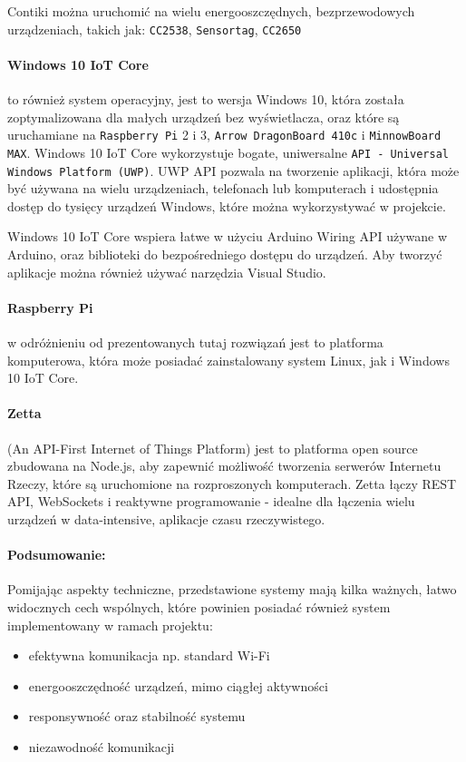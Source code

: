 Contiki można uruchomić na wielu energooszczędnych, bezprzewodowych urządzeniach, takich jak\cite{contiki-hardware-www}: \texttt{CC2538}, \texttt{Sensortag}, \texttt{CC2650}

\paragraph{Windows 10 IoT Core}\cite{windows-iot-www} to również system operacyjny, jest to wersja Windows 10, która została zoptymalizowana dla małych urządzeń bez wyświetlacza, oraz które są uruchamiane na \texttt{Raspberry Pi} 2 i 3, \texttt{Arrow DragonBoard 410c} i \texttt{MinnowBoard MAX}. 
Windows 10 IoT Core wykorzystuje bogate, uniwersalne \texttt{API - Universal Windows Platform (UWP)}. UWP API pozwala na tworzenie aplikacji, która może być używana na wielu urządzeniach, telefonach lub komputerach i udostępnia dostęp do tysięcy urządzeń Windows, które można wykorzystywać w projekcie.

Windows 10 IoT Core wspiera łatwe w użyciu Arduino Wiring API używane w Arduino, oraz biblioteki do bezpośredniego dostępu do urządzeń. Aby tworzyć aplikacje można również używać narzędzia Visual Studio.


\paragraph{Raspberry Pi}\cite{raspberry-www} w odróżnieniu od prezentowanych tutaj rozwiązań jest to platforma komputerowa, która może posiadać zainstalowany system Linux, jak i Windows 10 IoT Core.

\paragraph{Zetta}\cite{zetta-www} (An API-First Internet of Things Platform) jest to platforma open source zbudowana na Node.js, aby zapewnić możliwość tworzenia serwerów Internetu Rzeczy, które są uruchomione na rozproszonych komputerach. Zetta łączy REST API, WebSockets i reaktywne programowanie - idealne dla łączenia wielu urządzeń w data-intensive, aplikacje czasu rzeczywistego.

\paragraph{Podsumowanie:} Pomijając aspekty techniczne, przedstawione systemy mają kilka ważnych, łatwo widocznych cech wspólnych, które powinien posiadać również system implementowany w ramach projektu:

\begin{itemize}
	\item efektywna komunikacja np. standard Wi-Fi
	\item energooszczędność urządzeń, mimo ciągłej aktywności
	\item responsywność oraz stabilność systemu
	\item niezawodność komunikacji
\end{itemize}


